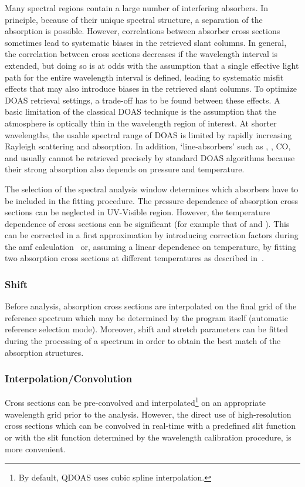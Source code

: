 Many spectral regions contain a large number of interfering
absorbers. In principle, because of their unique spectral structure, a
separation of the absorption is possible.  However, correlations
between absorber cross sections sometimes lead to systematic biases in
the retrieved slant columns.  In general, the correlation between
cross sections decreases if the wavelength interval is extended, but
doing so is at odds with the assumption that a single effective light
path for the entire wavelength interval is defined, leading to
systematic misfit effects that may also introduce biases in the
retrieved slant columns.  To optimize DOAS retrieval settings, a
trade-off has to be found between these effects.  A basic limitation
of the classical DOAS technique is the assumption that the atmosphere
is optically thin in the wavelength region of interest.  At shorter
wavelengths, the usable spectral range of DOAS is limited by rapidly
increasing Rayleigh scattering and \ozone{} absorption.  In addition,
‘line-absorbers’ such as \water, \oxygen, CO,  and  usually
cannot be retrieved precisely by standard DOAS algorithms because
their strong absorption also depends on pressure and temperature.

The selection of the spectral analysis window determines which
absorbers have to be included in the fitting procedure. The pressure
dependence of absorption cross sections can be neglected in UV-Visible
region. However, the temperature dependence of cross sections can be
significant (for example that of \ozone{} and ). This can be
corrected in a first approximation by introducing correction factors
during the \gls{amf} calculation~\citep{Boersma2004} or,
assuming a linear dependence on temperature, by fitting two absorption
cross sections at different temperatures as described
in~\citet{vanroozendael2002}.

\subsubsection{Shift}\label{sec:shift}
Before analysis, absorption cross sections are interpolated on the
final grid of the reference spectrum which may be determined by the
program itself (automatic reference selection mode). Moreover, shift
and stretch parameters can be fitted during the processing of a
spectrum in order to obtain the best match of the absorption
structures.

\subsubsection{Interpolation/Convolution}
Cross sections can be pre-convolved and interpolated\footnote{By
  default, QDOAS uses cubic spline interpolation.} on an appropriate
wavelength grid prior to the analysis. However, the direct use of
high-resolution cross sections which can be convolved in real-time
with a predefined slit function or with the slit function determined
by the wavelength calibration procedure, is more convenient.

